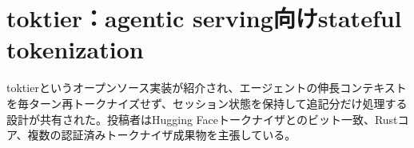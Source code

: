 \section{toktier：agentic serving向けstateful tokenization}

toktierというオープンソース実装が紹介され、エージェントの伸長コンテキストを毎ターン再トークナイズせず、セッション状態を保持して追記分だけ処理する設計が共有された。投稿者はHugging Faceトークナイザとのビット一致、Rustコア、複数の認証済みトークナイザ成果物を主張している。


